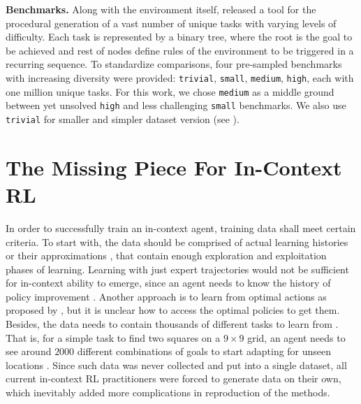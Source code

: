 \documentclass{article}
\begin{document}
\textbf{Benchmarks.} Along with the environment itself, \citet{nikulin2023xland} released a tool for the procedural generation of a vast number of unique tasks with varying levels of difficulty. Each task is represented by a binary tree, where the root is the goal to be achieved and rest of nodes define rules of the environment to be triggered in a recurring sequence. To standardize comparisons, four pre-sampled benchmarks with increasing diversity were provided: \texttt{trivial}, \texttt{small}, \texttt{medium}, \texttt{high}, each with one million unique tasks. For this work, we chose \texttt{medium} as a middle ground between yet unsolved \texttt{high} and less challenging \texttt{small} benchmarks. We also use \texttt{trivial} for smaller and simpler dataset version (see ).

\section{The Missing Piece For In-Context RL}
\label{sec:missing-data}

In order to successfully train an in-context agent, training data shall meet certain criteria. To start with, the data should be comprised of actual learning histories \citep{laskin2022context} or their approximations \citep{zisman2023emergence}, that contain enough exploration and exploitation phases of learning. Learning with just expert trajectories would not be sufficient for in-context ability to emerge, since an agent needs to know the history of policy improvement \citep{laskin2022context, kirsch2023towards}. Another approach is to learn from optimal actions as proposed by \cite{lee2023supervised}, but it is unclear how to access the optimal policies to get them. Besides, the data needs to contain thousands of different tasks to learn from \citep{kirsch2022general}. That is, for a simple task to find two squares on a $9\times9$ grid, an agent needs to see around $2000$ different combinations of goals to start adapting for unseen locations \citep{laskin2022context}. Since such data was never collected and put into a single dataset, all current in-context RL practitioners were forced to generate data on their own, which inevitably added more complications in reproduction of the methods. 
\end{document}
